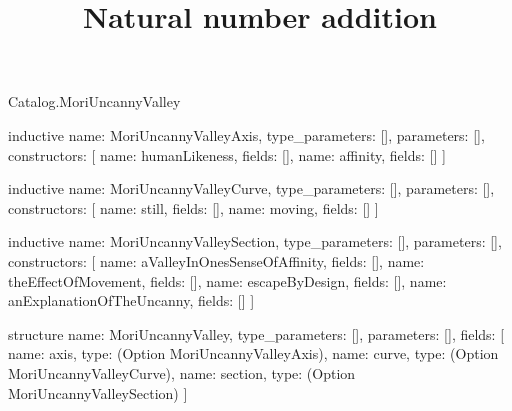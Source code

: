 \begin{lexlean}{Catalog.MoriUncannyValley}
\title{Natural number addition}
\begin{semanticmodule}
inductive{
  name: MoriUncannyValleyAxis,
  type_parameters: [],
  parameters: [],
  constructors: [
    {name: humanLikeness, fields: []},
    {name: affinity, fields: []}
  ]
}

inductive{
  name: MoriUncannyValleyCurve,
  type_parameters: [],
  parameters: [],
  constructors: [
    {name: still, fields: []},
    {name: moving, fields: []}
  ]
}

inductive{
  name: MoriUncannyValleySection,
  type_parameters: [],
  parameters: [],
  constructors: [
    {name: aValleyInOnesSenseOfAffinity, fields: []},
    {name: theEffectOfMovement, fields: []},
    {name: escapeByDesign, fields: []},
    {name: anExplanationOfTheUncanny, fields: []}
  ]
}

structure{
  name: MoriUncannyValley,
  type_parameters: [],
  parameters: [],
  fields: [
    {name: axis, type: (Option MoriUncannyValleyAxis)},
    {name: curve, type: (Option MoriUncannyValleyCurve)},
    {name: section, type: (Option MoriUncannyValleySection)}
  ]
}
\end{semanticmodule}
\end{lexlean}
